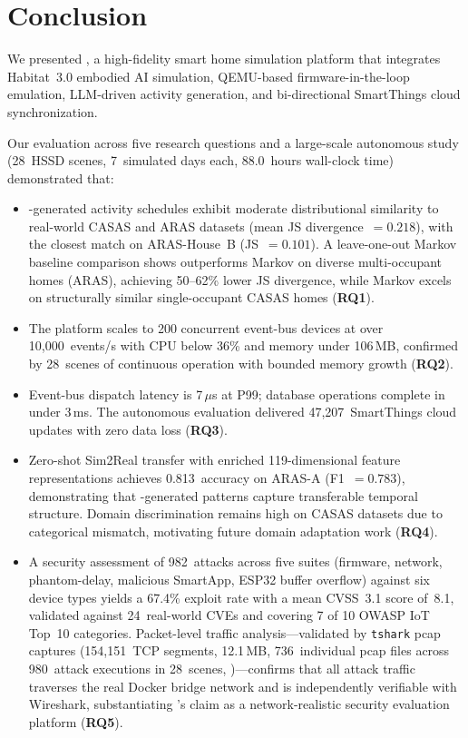 \section{Conclusion}\label{sec:conclusion}

We presented \sys{}, a high-fidelity smart home simulation platform
that integrates Habitat~3.0 embodied AI simulation, QEMU-based
firmware-in-the-loop emulation, LLM-driven activity generation, and
bi-directional SmartThings cloud synchronization.

Our evaluation across five research questions and a large-scale
autonomous study (28~HSSD scenes, 7~simulated days each, 88.0~hours
wall-clock time) demonstrated that:
\begin{itemize}[leftmargin=*]
  \item \sys{}-generated activity schedules exhibit moderate
    distributional similarity to real-world CASAS and ARAS datasets
    (mean JS divergence~$= 0.218$),
    with the closest match on ARAS-House~B (JS~$= 0.101$).
    A leave-one-out Markov baseline comparison shows \sys{}
    outperforms Markov on diverse multi-occupant homes (ARAS),
    achieving 50--62\% lower JS divergence, while Markov excels
    on structurally similar single-occupant CASAS homes
    (\textbf{RQ1}).
  \item The platform scales to 200 concurrent event-bus devices at
    over 10{,}000~events/s with CPU below 36\% and memory under
    106\,MB, confirmed by 28~scenes of continuous operation
    with bounded memory growth (\textbf{RQ2}).
  \item Event-bus dispatch latency is 7\,$\mu$s at P99; database
    operations complete in under 3\,ms.  The autonomous evaluation
    delivered 47{,}207~SmartThings cloud updates with zero data
    loss (\textbf{RQ3}).
  \item Zero-shot Sim2Real transfer with enriched 119-dimensional
    feature representations achieves 0.813~accuracy on ARAS-A
    (F1~$= 0.783$), demonstrating that \sys{}-generated patterns
    capture transferable temporal structure.  Domain discrimination
    remains high on CASAS datasets due to categorical mismatch,
    motivating future domain adaptation work (\textbf{RQ4}).
  \item A security assessment of 982~attacks across five suites
    (firmware, network, phantom-delay, malicious SmartApp, ESP32
    buffer overflow) against six device types yields a 67.4\%
    exploit rate with a mean CVSS~3.1 score of~8.1, validated
    against 24~real-world CVEs and covering 7 of 10 OWASP IoT
    Top~10 categories.
    Packet-level traffic analysis---validated by \texttt{tshark}
    pcap captures (154{,}151~TCP segments, 12.1\,MB, 736~individual
    pcap files across 980~attack executions in 28~scenes,
    )---confirms that all attack traffic
    traverses the real Docker bridge network and is independently
    verifiable with Wireshark, substantiating \sys{}'s claim as a
    network-realistic security evaluation platform (\textbf{RQ5}).
\end{itemize}

